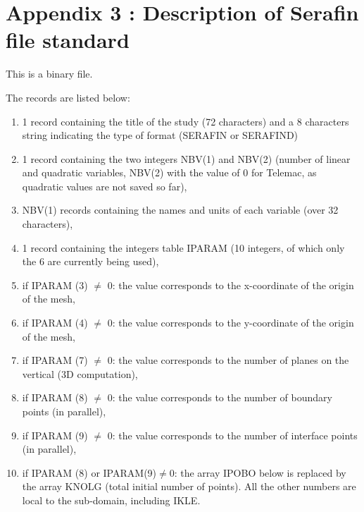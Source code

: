 

 \chapter {Appendix 3 : Description of Serafin file standard}




 This is a binary file.

 The records are listed below:

\begin{enumerate}
\item  1 record containing the title of the study (72 characters) and a 8 characters string indicating the type of format (SERAFIN or SERAFIND)

\item  1 record containing the two integers NBV(1) and NBV(2) (number of linear and quadratic variables, NBV(2) with the value of 0 for Telemac, as quadratic values are not saved so far),

\item  NBV(1) records containing the names and units of each variable (over 32 characters),

\item  1 record containing the integers table IPARAM (10 integers, of which only the 6 are currently being used),

\item  if IPARAM (3) $\neq$ 0: the value corresponds to the x-coordinate of the origin of the mesh,

\item  if IPARAM (4) $\neq$ 0: the value corresponds to the y-coordinate of the origin of the mesh,

\item  if IPARAM (7) $\neq$ 0: the value corresponds to the number of  planes on the vertical (3D computation),

\item  if IPARAM (8) $\neq$ 0: the value corresponds to the number of boundary points (in parallel),

\item  if IPARAM (9) $\neq$ 0: the value corresponds to the number of interface points (in parallel),

\item  if IPARAM (8) or IPARAM(9)$\neq$0: the array IPOBO below is replaced by the array KNOLG (total initial number of points). All the other numbers are local to the sub-domain, including IKLE.


\end{enumerate}
